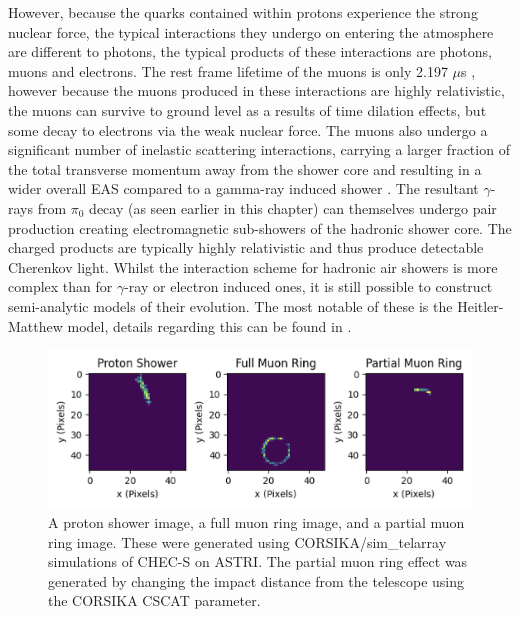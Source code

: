 However, because the quarks contained within protons experience the strong nuclear force, the typical interactions they undergo on entering the atmosphere are different to photons, the typical products of these interactions are photons, muons and electrons. The rest frame lifetime of the muons is only 2.197 $\mu$s \cite{pdg}, however because the muons produced in these interactions are highly relativistic, the muons can survive to ground level as a results of time dilation effects, but some decay to electrons via the weak nuclear force. The muons also undergo a significant number of inelastic scattering interactions, carrying a larger fraction of the total transverse momentum away from the shower core and resulting in a wider overall EAS compared to a gamma-ray induced shower \cite{tomthesis}.  The resultant $\gamma$-rays from $\pi_0$ decay (as seen earlier in this chapter) can themselves undergo pair production creating electromagnetic sub-showers of the hadronic shower core. The charged products are typically highly relativistic and thus produce detectable Cherenkov light.  Whilst the interaction scheme for hadronic air showers is more complex than for $\gamma$-ray or electron induced ones, it is still possible to construct semi-analytic models of their evolution. The most notable of these is the Heitler-Matthew model, details regarding this can be found in \cite{heitler}.
\begin{figure}[h!]
\begin{center}  

\includegraphics[width=\columnwidth]{figures/muonplot.png}
 
\caption{A proton shower image, a full muon ring image, and a partial muon ring image. These were generated using CORSIKA/sim\_telarray simulations of CHEC-S on ASTRI. The partial muon ring effect was generated by changing the impact distance from the telescope using the CORSIKA CSCAT parameter.}
\label{fig:muonplot}
\end{center}
\end{figure}

